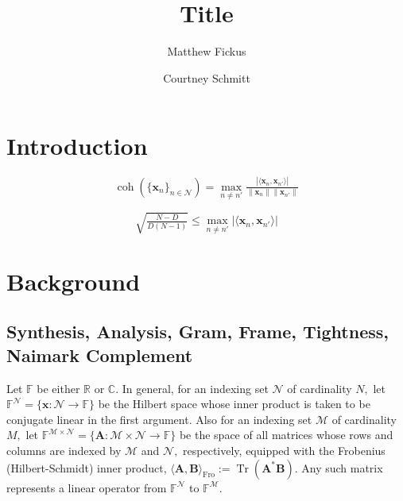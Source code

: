\documentclass[3p,11pt]{elsarticle}
\newcommand{\bbC}{\mathbb{C}}
\newcommand{\bbF}{\mathbb{F}}
\newcommand{\bbR}{\mathbb{R}}
\newcommand{\bfA}{\mathbf{A}}
\newcommand{\bfB}{\mathbf{B}}
\newcommand{\bfx}{\mathbf{x}}
\newcommand{\calM}{\mathcal{M}}
\newcommand{\calN}{\mathcal{N}}
\newcommand{\Tr}{\operatorname{Tr}}
\newcommand{\coh}{{\operatorname{coh}}}
\newcommand{\Fro}{\mathrm{Fro}}
\newcommand{\abs}[1]{|{#1}|}
\newcommand{\norm}[1]{\|{#1}\|}
\newcommand{\ip}[2]{\langle{#1},{#2}\rangle}
\theoremstyle{definition}
\begin{document}
\begin{frontmatter}
\title{Title}

\author{Matthew Fickus}
\author{Courtney Schmitt}

\address{Department of Mathematics and Statistics, Air Force Institute of Technology, Wright-Patterson AFB, OH 45433}

\begin{abstract}

\end{abstract}

\end{frontmatter}
\section{Introduction}

\begin{equation}
	\label{eq:Coherence}
	\coh(\{\bfx_n\}_{n\in\calN})=\max_{n\not=n'}\tfrac{\abs{\ip{\bfx_n}{\bfx_{n'}}}}{\norm{\bfx_n}\norm{\bfx_{n'}}}
\end{equation}

\begin{equation}
\label{eq:Wlech Bound}
    \sqrt{\tfrac{N-D}{D(N-1)}}\leq\max_{n\not=n'}\abs{\ip{\bfx_n}{\bfx_{n'}}}
\end{equation}






\section{Background}
\subsection{Synthesis, Analysis, Gram, Frame, Tightness, Naimark Complement}

Let $\bbF$ be either $\bbR$ or $\bbC.$ In general, for an indexing set $\calN$ of cardinality $N,$ let $\bbF^\calN=\{\bfx:\calN\to\bbF\}$ be the Hilbert space whose inner product is taken to be conjugate linear in the first argument. Also for an indexing set $\calM$ of cardinality $M,$ let $\bbF^{\calM\times\calN}=\{\bfA:\calM\times\calN\to\bbF\}$ be the space of all matrices whose rows and columns are indexed by $\calM$ and $\calN,$ respectively, equipped with the Frobenius (Hilbert-Schmidt) inner product, $\ip{\bfA}{\bfB}_\Fro:=\Tr(\bfA^*\bfB).$ Any such matrix represents a linear operator from $\bbF^\calN$ to $\bbF^\calM.$ 
\end{document}

